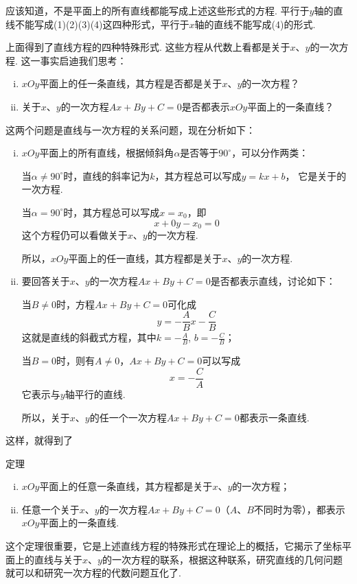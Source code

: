 应该知道，不是平面上的所有直线都能写成上述这些形式的方程. 平行于$y$轴的直线不能写成(1)(2)(3)(4)这四种形式，平行于$x$轴的直线不能写成(4)的形式.

上面得到了直线方程的四种特殊形式. 这些方程从代数上看都是关于$x$、$y$的一次方程. 这一事实启迪我们思考：
\begin{enumerate}[(i)]
\item $xOy$平面上的任一条直线，其方程是否都是关于$x$、$y$的一次方程？
\item 关于$x$、$y$的一次方程$Ax+By+C=0$是否都表示$xOy$平面上的一条直线？
\end{enumerate}


这两个问题是直线与一次方程的关系问题，现在分析如下：
\begin{enumerate}[(i)]
    \item $xOy$平面上的所有直线，根据倾斜角$\alpha$是否等于$90^{\circ}$，可以分作两类：

    当$\alpha\ne 90^{\circ}$时，直线的斜率记为$k$，其方程总可以写成$y=kx+b$，
它是关于的一次方程.

当$\alpha=90^{\circ}$时，其方程总可以写成$x=x_0$，即
\[x+0y-x_0=0\]
这个方程仍可以看做关于$x$、$y$的一次方程.

所以，$xOy$平面上的任一直线，其方程都是关于$x$、$y$的一次方程.
\item 要回答关于$x$、$y$的一次方程$Ax+By+C=0$是否都表示直线，讨论如下：

当$B\ne 0$时，方程$Ax+By+C=0$可化成
\[y=-\frac{A}{B}x-\frac{C}{B}\]
这就是直线的斜截式方程，其中$k=-\frac{A}{B}$, $b=-\frac{C}{B}$；

当$B=0$时，则有$A\ne 0$，$Ax+By+C=0$可以写成
\[x=-\frac{C}{A}\]
它表示与$y$轴平行的直线.

所以，关于$x$、$y$的任一个一次方程$Ax+By+C=0$都表示一条直线.
\end{enumerate}

这样，就得到了
\begin{thm}
{定理}
\begin{enumerate}[(i)]
\item $xOy$平面上的任意一条直线，其方程都是关于$x$、$y$的一次方程；
\item 任意一个关于$x$、$y$的一次方程$Ax+By+C=0$（$A$、$B$不同时为零），都表示$xOy$平面上的一条直线.    
\end{enumerate} 
\end{thm}

这个定理很重要，它是上述直线方程的特殊形式在理论上的概括，它揭示了坐标平面上的直线与关于$x$、$y$的一次方程的联系，根据这种联系，研究直线的几何问题就可以和研究一次方程的代数问题互化了.

